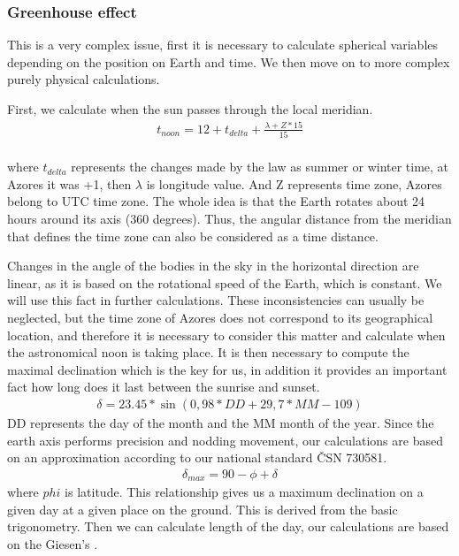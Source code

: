 \documentclass{cfp}
\begin{document}
\subsubsection{Greenhouse effect}
\par This is a very complex issue, first it is necessary to calculate spherical variables depending on the position on Earth and time. We then move on to more complex purely physical calculations.
\par First, we calculate when the sun passes through the local meridian.
\begin{align}
t_{noon} = 12 + t_{delta} + \frac{\lambda+Z*15}{15}\\
\end{align}
\par where $t_{delta}$ represents the changes made by the law as summer or winter time, at Azores it was +1, then $\lambda$ is longitude value. And Z represents time zone, Azores belong to UTC time zone. The whole idea is that the Earth rotates about 24 hours around its axis (360 degrees). Thus, the angular distance from the meridian that defines the time zone can also be considered as a time distance. 
\par Changes in the angle of the bodies in the sky in the horizontal direction are linear, as it is based on the rotational speed of the Earth, which is constant. We will use this fact in further calculations. These inconsistencies can usually be neglected, but the time zone of Azores does not correspond to its geographical location, and therefore it is necessary to consider this matter and calculate when the astronomical noon is taking place. It is then necessary to compute the maximal declination which is the key for us, in addition it provides an important fact how long does it last between the sunrise and sunset.
\begin{align}
\delta = 23.45*\sin(0,98*DD+29,7*MM-109)
\end{align}
DD represents the day of the month and the MM month of the year. Since the earth axis performs precision and nodding movement, our calculations are based on an approximation according to our national standard ČSN 730581.
\begin{align}
\delta_{max} = 90-\phi+\delta
\end{align}
where $phi$ is latitude. This relationship gives us a maximum declination on a given day at a given place on the ground. This is derived from the basic trigonometry. Then we can calculate length of the day, our calculations are based on the Giesen's \cite{Giesen}.
\end{document}
